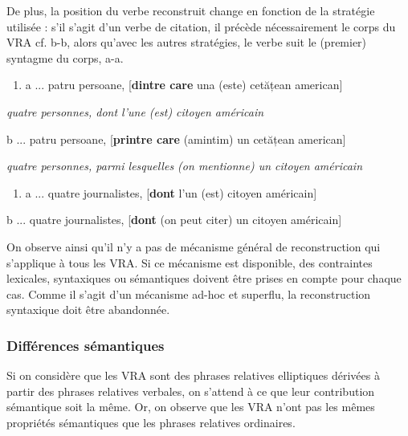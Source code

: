 De plus, la position du verbe reconstruit change en fonction de la stratégie utilisée : s'il s'agit d'un verbe de citation, il précède nécessairement le corps du VRA cf. b-b, alors qu'avec les autres stratégies, le verbe suit le (premier) syntagme du corps, a-a.


\begin{enumerate}
\item \label{bkm:Ref295811943}a  ... patru persoane, [\textbf{dintre care} una (este) cetățean american]  


\end{enumerate}
{\itshape
quatre personnes, dont l'une (est) citoyen américain}

  b  ... patru persoane, [\textbf{printre care} (amintim) un cetățean american]

{\itshape
quatre personnes, parmi lesquelles (on mentionne) un citoyen américain} 


\begin{enumerate}
\item \label{bkm:Ref295811946}a  ... quatre journalistes, [\textbf{dont} l'un (est) citoyen américain] 


\end{enumerate}
  b  ... quatre journalistes, [\textbf{dont} (on peut citer)\textbf{} un citoyen américain]  

On observe ainsi qu'il n'y a pas de mécanisme général de reconstruction qui s'applique à tous les VRA. Si ce mécanisme est disponible, des contraintes lexicales, syntaxiques ou sémantiques doivent être prises en compte pour chaque cas. Comme il s'agit d'un mécanisme ad-hoc et superflu, la reconstruction syntaxique doit être abandonnée.  

\subsubsection{Différences sémantiques}
Si on considère que les VRA sont des phrases relatives elliptiques dérivées à partir des phrases relatives verbales, on s'attend à ce que leur contribution sémantique soit la même. Or, on observe que les VRA n'ont pas les mêmes propriétés sémantiques que les phrases relatives ordinaires.


